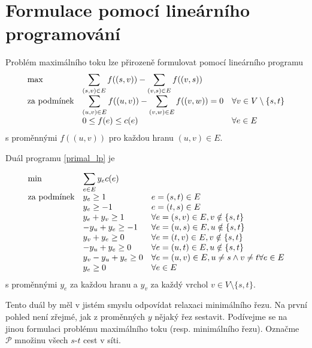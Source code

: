 \documentclass{article}
\theoremstyle{plain}
\theoremstyle{definition}
\begin{document}
\section{Formulace pomocí lineárního programování}
Problém maximálního toku lze přirozeně formulovat pomocí lineárního programu
\begin{equation}\label{primal_lp}
\begin{array}{ll@{}ll}
\text{max} & \displaystyle\sum_{(s,v)\in E}f((s,v)) - \displaystyle \sum_{(v,s)\in E}f((v,s)) &\\
\text{za podmínek}& \displaystyle\sum_{(u,v)\in E} f((u,v)) - \sum_{(v,w)\in E} f((v,w)) = 0   & & \forall v \in V\setminus \{s,t\}\\
& 0\leq f(e)\leq c(e) & & \forall e\in E
\end{array}
\end{equation}
s proměnnými $f((u,v))$ pro každou hranu $(u,v)\in E$.

Duál programu \ref{primal_lp} je

\begin{equation}\label{dual_lp}
\begin{array}{ll@{}ll}
\text{min} & \displaystyle\sum_{e\in E}y_ec(e)  &\\
\text{za podmínek}& y_e\geq 1   & & e=(s,t)\in E\\
& y_e \geq -1& & e=(t,s)\in E \\
&y_e+y_v\geq 1 & &\forall e=(s,v)\in E,v\notin\{s,t\} \\
&-y_u+y_e \geq -1 & & \forall e=(u,s)\in E,u\notin\{s,t\}\\

&y_v+y_e\geq 0 & & \forall e=(t,v)\in E,v\notin\{s,t\}\\

&-y_u+y_e\geq 0 & & \forall e=(u,t)\in E,u\notin\{s,t\}\\

& y_v-y_u+y_{e} \geq 0 & & \forall e=(u,v)\in E,u\neq s \wedge v \neq t \forall e\in E\\

&y_e\geq 0 & & \forall e\in E
\end{array}
\end{equation}
s proměnnými $y_e$ za každou hranu a $y_v$ za každý vrchol $v\in V\setminus \{s,t\}$.

Tento duál by měl v jistém smyslu odpovídat relaxaci minimálního řezu.  Na první pohled není zřejmé, jak z proměnných $y$ nějaký řez sestavit. Podívejme se na jinou formulaci problému maximálního toku (resp. minimálního řezu). Označme $\mathcal{P}$ množinu všech $s$-$t$ cest v síti. 
\end{document}
